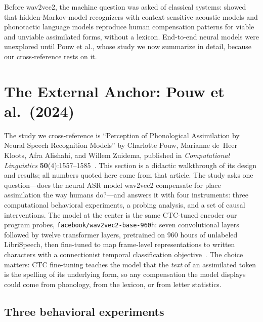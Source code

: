 \documentclass[11pt,a4paper]{article}
\newcommand{\sampa}[1]{\texttt{#1}}
\begin{document}
Before wav2vec2, the machine question was asked of classical systems:
\citet{jiang2020} showed that hidden-Markov-model recognizers with
context-sensitive acoustic models and phonotactic language models
reproduce human compensation patterns for viable and unviable
assimilated forms, without a lexicon. End-to-end neural models were
unexplored until Pouw et al., whose study we now summarize in detail,
because our cross-reference rests on it.

\needspace{0.22\textheight}
\section{The External Anchor: Pouw et al.\ (2024)}\label{sec:pouw}

The study we cross-reference is ``Perception of Phonological
Assimilation by Neural Speech Recognition Models'' by Charlotte Pouw,
Marianne de~Heer Kloots, Afra Alishahi, and Willem
Zuidema, published in \emph{Computational Linguistics}
\textbf{50}(4):1557--1585~\citep{pouw2024}. This section is a didactic
walkthrough of its design and results; all numbers quoted here come
from that article. The study asks one question---does the neural ASR
model wav2vec2 compensate for place assimilation the way humans
do?---and answers it with four instruments: three computational
behavioral experiments, a probing analysis, and a set of causal
interventions. The model at the center is the same CTC-tuned encoder
our program probes, \sampa{facebook/wav2vec2-base-960h}: seven
convolutional layers followed by twelve transformer layers, pretrained
on 960 hours of unlabeled LibriSpeech, then fine-tuned to map
frame-level representations to written characters with a connectionist
temporal classification objective~\citep{baevski2020,graves2006}. The
choice matters: CTC fine-tuning teaches the model that the \emph{text}
of an assimilated token is the spelling of its underlying form, so any
compensation the model displays could come from phonology, from the
lexicon, or from letter statistics.

\subsection{Three behavioral experiments}
\end{document}
